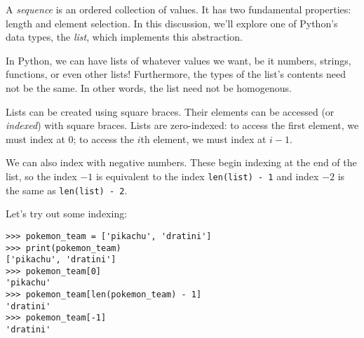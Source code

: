 A \textit{sequence} is an ordered collection of values. It has two
fundamental properties: length and element selection. In this
discussion, we'll explore one of Python's data types,
the \textit{list}, which implements this abstraction.

In Python, we can have lists of whatever values we want, be it
numbers, strings, functions, or even other lists!  Furthermore, the
types of the list's contents need not be the same. In other words, the
list need not be homogenous.

Lists can be created using square braces. Their elements can be
accessed (or \textit{indexed}) with square braces. Lists are
zero-indexed: to access the first element, we must index at 0; to access
the $i$th element, we must index at $i - 1$.

We can also index with negative numbers. These begin indexing at the
end of the list, so the index $-1$ is equivalent to the index
\texttt{len(list) - 1} and index $-2$ is the same as
\texttt{len(list) - 2}.

Let's try out some indexing:
\begin{lstlisting}
>>> pokemon_team = ['pikachu', 'dratini']
>>> print(pokemon_team)
['pikachu', 'dratini']
>>> pokemon_team[0]
'pikachu'
>>> pokemon_team[len(pokemon_team) - 1]
'dratini'
>>> pokemon_team[-1]
'dratini'
\end{lstlisting}
